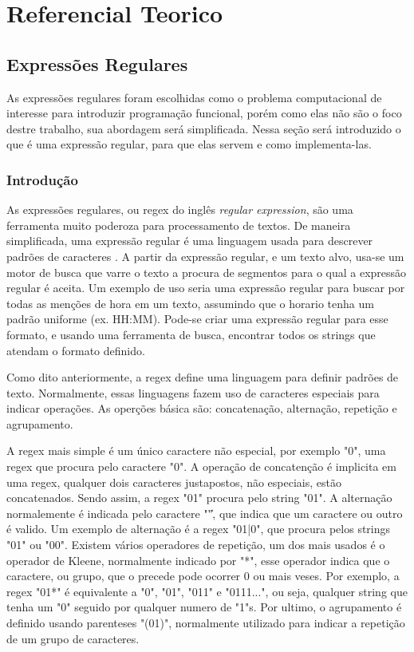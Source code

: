 \section{Referencial Teorico}

\subsection{Expressões Regulares}
As expressões regulares foram escolhidas como o problema computacional de interesse para introduzir programação funcional, porém como elas não são o foco destre trabalho, sua abordagem será simplificada.
Nessa seção será introduzido o que é uma expressão regular, para que elas servem e como implementa-las.

\subsubsection{Introdução}
As expressões regulares, ou regex do inglês \emph{regular expression}, são uma ferramenta muito poderoza para processamento de textos.
De maneira simplificada, uma expressão regular é uma linguagem usada para descrever padrões de caracteres \cite{mastering}.
A partir da expressão regular, e um texto alvo, usa-se um motor de busca que varre o texto a procura de segmentos para o qual a expressão regular é aceita.
Um exemplo de uso seria uma expressão regular para buscar por todas as menções de hora em um texto, assumindo que o horario tenha um padrão uniforme (ex. HH:MM).
Pode-se criar uma expressão regular para esse formato, e usando uma ferramenta de busca, encontrar todos os strings que atendam o formato definido.

Como dito anteriormente, a regex define uma linguagem para definir padrões de texto.
Normalmente, essas linguagens fazem uso de caracteres especiais para indicar operações.
As operções básica são: concatenação, alternação, repetição e agrupamento.

A regex mais simple é um único caractere não especial, por exemplo "0", uma regex que procura pelo caractere "0".
A operação de concatenção é implicita em uma regex, qualquer dois caracteres justapostos, não especiais, estão concatenados.
Sendo assim, a regex "01" procura pelo string "01".
A alternação normalemente é indicada pelo caractere "\|", que indica que um caractere ou outro é valido.
Um exemplo de alternação é a regex "01|0", que procura pelos strings "01" ou "00".
Existem vários operadores de repetição, um dos mais usados é o operador de Kleene, normalmente indicado por "*", esse operador indica que o caractere, ou grupo, que o precede pode ocorrer 0 ou mais veses.
Por exemplo, a regex "01*" é equivalente a "0", "01", "011" e "0111...", ou seja, qualquer string que tenha um "0" seguido por qualquer numero de "1"s.
Por ultimo, o agrupamento é definido usando parenteses "(01)", normalmente utilizado para indicar a repetição de um grupo de caracteres\cite{mastering}.

